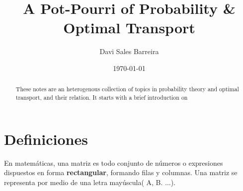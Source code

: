 \documentclass[10pt]{article}
\title{A Pot-Pourri of Probability \& Optimal Transport}
\author{Davi Sales Barreira}
\date{\today}
\begin{document}
\maketitle \tableofcontents 


\begin{abstract}
These notes are an heterogenous collection of topics in probability theory and
optimal transport, and their relation. It starts with a brief introduction on 
\end{abstract}

\section{Definiciones}
En matemáticas, una matriz es todo conjunto de números o expresiones dispuestos en forma \textbf{rectangular}, formando filas y columnas. Una matriz se representa por medio de una letra mayúscula( A, B. ...).


 
 
\end{document}
